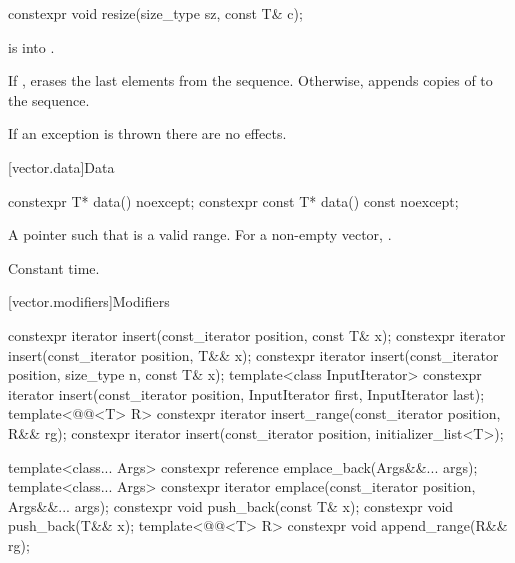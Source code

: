 %
\begin{itemdecl}
constexpr void resize(size_type sz, const T& c);
\end{itemdecl}

\begin{itemdescr}
\pnum
\expects
{} is
 into .

\pnum
\effects
If , erases the last  elements
from the sequence. Otherwise,
appends  copies of  to the sequence.

\pnum
\remarks
If an exception is thrown there are no effects.
\end{itemdescr}

[vector.data]{Data}

%
\begin{itemdecl}
constexpr T*         data() noexcept;
constexpr const T*   data() const noexcept;
\end{itemdecl}

\begin{itemdescr}
\pnum
\returns
A pointer such that  is a valid range. For a
non-empty vector,  \tcode{==} .

\pnum
\complexity
Constant time.
\end{itemdescr}

[vector.modifiers]{Modifiers}

%
\begin{itemdecl}
constexpr iterator insert(const_iterator position, const T& x);
constexpr iterator insert(const_iterator position, T&& x);
constexpr iterator insert(const_iterator position, size_type n, const T& x);
template<class InputIterator>
  constexpr iterator insert(const_iterator position, InputIterator first, InputIterator last);
template<@@<T> R>
  constexpr iterator insert_range(const_iterator position, R&& rg);
constexpr iterator insert(const_iterator position, initializer_list<T>);

template<class... Args> constexpr reference emplace_back(Args&&... args);
template<class... Args> constexpr iterator emplace(const_iterator position, Args&&... args);
constexpr void push_back(const T& x);
constexpr void push_back(T&& x);
template<@@<T> R>
  constexpr void append_range(R&& rg);
\end{itemdecl}

